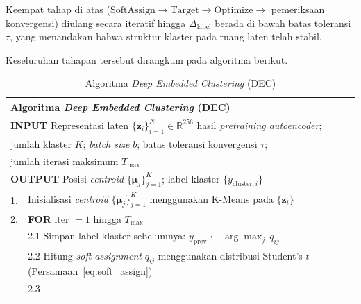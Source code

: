 \noindent Keempat tahap di atas ($\text{SoftAssign} \to \text{Target}
\to \text{Optimize} \to$ pemeriksaan konvergensi) diulang secara
iteratif hingga $\Delta_{\text{label}}$ berada di bawah batas toleransi
$\tau$, yang menandakan bahwa struktur klaster pada ruang laten telah
stabil.

Keseluruhan tahapan tersebut dirangkum pada algoritma berikut.

\begin{table}[H]
\centering
\caption{Algoritma \textit{Deep Embedded Clustering} (DEC)}
\label{tab:alg_dec}
\begin{tabular}{p{} p{}}
\hline
\multicolumn{2}{l}{\textbf{Algoritma} \textit{Deep Embedded Clustering} (DEC)} \\
\hline
\multicolumn{2}{l}{\textbf{INPUT} \hspace{1.2em}
    Representasi laten $\{\mathbf{z}_i\}_{i=1}^{N} \in \mathbb{R}^{256}$
    hasil \textit{pretraining autoencoder};} \\
\multicolumn{2}{l}{\hspace{4.7em}
    jumlah klaster $K$; \textit{batch size} $b$;
    batas toleransi konvergensi $\tau$;} \\
\multicolumn{2}{l}{\hspace{4.7em}
    jumlah iterasi maksimum $T_{\max}$} \\[2pt]
\multicolumn{2}{l}{\textbf{OUTPUT} \hspace{0.5em}
    Posisi \textit{centroid} $\{\boldsymbol{\mu}_j\}_{j=1}^{K}$;
    label klaster $\{y_{\text{cluster},i}\}$} \\
\hline
1. & Inisialisasi \textit{centroid} $\{\boldsymbol{\mu}_j\}_{j=1}^{K}$
     menggunakan K-Means pada $\{\mathbf{z}_i\}$ \\[3pt]
2. & \textbf{FOR} iter $= 1$ hingga $T_{\max}$ \\[3pt]
   & \hspace{1em} 2.1 \hspace{0.5em}
     Simpan label klaster sebelumnya:
     $y_{\text{prev}} \leftarrow \arg\max_j\, q_{ij}$ \\[3pt]
   & \hspace{1em} 2.2 \hspace{0.5em}
     Hitung \textit{soft assignment} $q_{ij}$ menggunakan
     distribusi Student's $t$ (Persamaan~\ref{eq:soft_assign}) \\[3pt]
   & \hspace{1em} 2.3 \hspace{0.5em}

\end{tabular}
\end{table}
